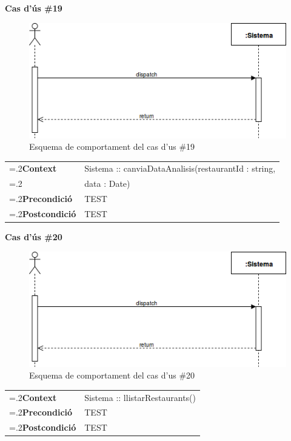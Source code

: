 \clearpage
\noindent\textbf{\large Cas d'ús \#19}\\
\begin{figure}[H]
\centering
\includegraphics[scale=0.6]{Figures/casdus_00.png}
\caption{Esquema de comportament del cas d'us \#19}
\end{figure}
\begin{table}[h]
\noindent
\begin{tabularx}{\linewidth}{
>{\hsize=.2\hsize}X%
>{\hsize=0.8\hsize}X%
}
\textbf{Context} 		& Sistema :: canviaDataAnalisis(restaurantId : string,\\
						& data : Date) \\
\textbf{Precondició} 	& TEST \\
\textbf{Postcondició}	& TEST \\
\end{tabularx}
\label{}
\end{table}

\noindent\textbf{\large Cas d'ús \#20}\\
\begin{figure}[H]
\centering
\includegraphics[scale=0.6]{Figures/casdus_00.png}
\caption{Esquema de comportament del cas d'us \#20}
\end{figure}
\begin{table}[h]
\noindent
\begin{tabularx}{\linewidth}{
>{\hsize=.2\hsize}X%
>{\hsize=0.8\hsize}X%
}
\textbf{Context} 		& Sistema :: llistarRestaurants() \\
\textbf{Precondició} 	& TEST \\
\textbf{Postcondició}	& TEST \\
\end{tabularx}
\label{}
\end{table}

